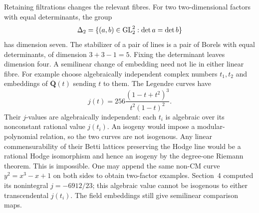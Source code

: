 \documentclass[11pt]{article}
\theoremstyle{definition}\newtheorem{definition}[theorem]{Definition}
\theoremstyle{remark}\newtheorem{remark}[theorem]{Remark}
\newcommand{\Qb}{\overline{\mathbf Q}}\newcommand{\Fp}{\mathbf F_p}
\begin{document}
Retaining filtrations changes the relevant fibres. For two two-dimensional factors with equal determinants, the group
\[
 \Delta_2=\{(a,b)\in\operatorname{GL}_2^2:\det a=\det b\}
\]
has dimension seven. The stabilizer of a pair of lines is a pair of Borels with equal determinants, of dimension $3+3-1=5$. Fixing the determinant leaves dimension four. A semilinear change of embedding need not lie in either linear fibre. For example choose algebraically independent complex numbers $t_1,t_2$ and embeddings of $\Qb(t)$ sending $t$ to them. The Legendre curves have
\[
 j(t)=256\frac{(1-t+t^2)^3}{t^2(1-t)^2}.
\]
Their $j$-values are algebraically independent: each $t_i$ is algebraic over its nonconstant rational value $j(t_i)$. An isogeny would impose a modular-polynomial relation, so the two curves are not isogenous. Any linear commensurability of their Betti lattices preserving the Hodge line would be a rational Hodge isomorphism and hence an isogeny by the degree-one Riemann theorem. This is impossible. One may append the same non-CM curve $y^2=x^3-x+1$ on both sides to obtain two-factor examples. Section~4 computed its nonintegral $j=-6912/23$; this algebraic value cannot be isogenous to either transcendental $j(t_i)$. The field embeddings still give semilinear comparison maps.
\end{document}
